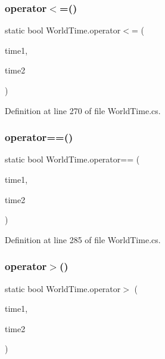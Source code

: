 \subsubsection{\texorpdfstring{operator$<$=()}{operator<=()}}
{\footnotesize\ttfamily static bool World\+Time.\+operator$<$= (\begin{DoxyParamCaption}\item[{\hyperlink{struct_world_time}{World\+Time}}]{time1,  }\item[{\hyperlink{struct_world_time}{World\+Time}}]{time2 }\end{DoxyParamCaption})\hspace{0.3cm}{\ttfamily [static]}}



Definition at line 270 of file World\+Time.\+cs.

\mbox{\label{struct_world_time_a037c1f58f3722a18e684a6120e8a6b3b}} 
\subsubsection{\texorpdfstring{operator==()}{operator==()}}
{\footnotesize\ttfamily static bool World\+Time.\+operator== (\begin{DoxyParamCaption}\item[{\hyperlink{struct_world_time}{World\+Time}}]{time1,  }\item[{\hyperlink{struct_world_time}{World\+Time}}]{time2 }\end{DoxyParamCaption})\hspace{0.3cm}{\ttfamily [static]}}



Definition at line 285 of file World\+Time.\+cs.

\mbox{\label{struct_world_time_a6c47b1a280ee475b06f8c462a1b0b96f}} 
\subsubsection{\texorpdfstring{operator$>$()}{operator>()}}
{\footnotesize\ttfamily static bool World\+Time.\+operator$>$ (\begin{DoxyParamCaption}\item[{\hyperlink{struct_world_time}{World\+Time}}]{time1,  }\item[{\hyperlink{struct_world_time}{World\+Time}}]{time2 }\end{DoxyParamCaption})\hspace{0.3cm}{\ttfamily [static]}}



